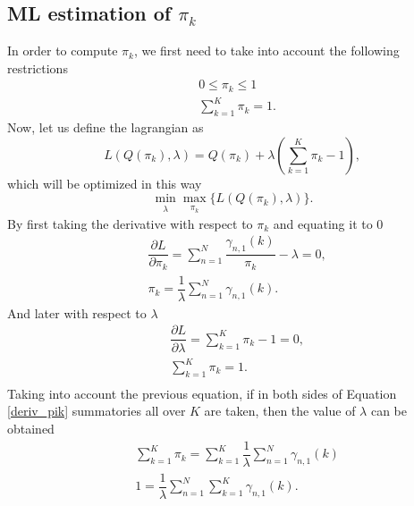 \documentclass[12pt]{article}
\begin{document}
\subsection{ML estimation of $\pi_{k}$}
In order to compute $\pi_{k}$, we first need to take into account the following restrictions
\begin{align}
& 0 \leq \pi_{k} \leq 1 \\
& \sum\limits_{k = 1}^{K} \pi_{k} = 1.
\end{align}
Now, let us define the lagrangian as
\begin{equation}
\label{lagrange_pik}
L\left( Q(\pi_{k}),\lambda \right) = Q(\pi_{k}) + \lambda \left( \sum \limits_{k=1}^{K} \pi_{k} - 1 \right),
\end{equation}
which will be optimized in this way
\begin{equation}
\label{minmax_lagrange_pik}
\min_{\substack{\lambda}} \max_{\substack{\pi_{k}}} \lbrace L\left( Q(\pi_{k}),\lambda \right) \rbrace.
\end{equation}
By first taking the derivative with respect to $\pi_{k}$ and equating it to 0
\begin{equation}
\label{deriv_pik}
\begin{split}
& \dfrac{\partial L}{\partial \pi_{k}} = \sum \limits_{n=1}^{N} \dfrac{\gamma_{n,1}(k)}{\pi_{k}} - \lambda = 0, \\
& \pi_{k} = \dfrac{1}{\lambda} \sum \limits_{n=1}^{N} \gamma_{n,1}(k).
\end{split}
\end{equation}
And later with respect to $\lambda$
\begin{equation}
\begin{split}
& \dfrac{\partial L}{\partial \lambda} = \sum \limits_{k=1}^{K} \pi_{k} - 1 = 0,\\
& \sum \limits_{k=1}^{K} \pi_{k} = 1.\\
\end{split}
\end{equation}
Taking into account the previous equation, if in both sides of Equation \ref{deriv_pik} summatories all over $K$ are taken, then the value of $\lambda$ can be obtained
\begin{equation}
\begin{split}
& \sum \limits_{k=1}^{K}\pi_{k} = \sum \limits_{k=1}^{K} \dfrac{1}{\lambda} \sum \limits_{n=1}^{N} \gamma_{n,1}(k)\\
& 1 = \dfrac{1}{\lambda} \sum \limits_{n=1}^{N}\sum \limits_{k=1}^{K}\gamma_{n,1}(k).\\
\end{split}
\end{equation}
\end{document}
